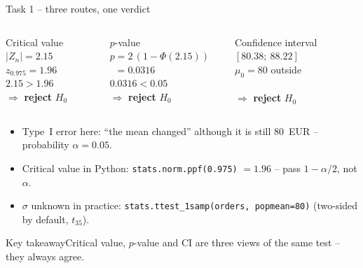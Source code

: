 \documentclass[aspectratio=169,11pt]{beamer}
\newcommand{\kernaussage}[1]{\begin{alertblock}{Key takeaway}#1\end{alertblock}}
\begin{document}
\begin{frame}{Task 1 -- three routes, one verdict}
  \begin{columns}[T]
    \begin{block}{Critical value}
      $|Z_n| = 2.15$\\ $z_{0.975} = 1.96$\\[2pt]
      $2.15 > 1.96$\\ $\Rightarrow$ \textbf{reject} $H_0$
    \end{block}
    \begin{block}{$p$-value}
      $p = 2\,(1-\Phi(2.15))$\\ $\phantom{p} = 0.0316$\\[2pt]
      $0.0316 < 0.05$\\ $\Rightarrow$ \textbf{reject} $H_0$
    \end{block}
    \begin{block}{Confidence interval}
      $[80.38;\ 88.22]$\\ $\mu_0 = 80$ outside\\[2pt]
      \phantom{x}\\ $\Rightarrow$ \textbf{reject} $H_0$
    \end{block}
  \end{columns}
  \medskip
  \begin{itemize}\setlength{\itemsep}{2pt}
    \item Type~I error here: ``the mean changed'' although it is still $80$~EUR -- probability $\alpha = 0.05$.
    \item Critical value in Python: \texttt{stats.norm.ppf(0.975)} $= 1.96$ -- pass $1-\alpha/2$, not $\alpha$.
    \item $\sigma$ unknown in practice: \texttt{stats.ttest\_1samp(orders, popmean=80)} (two-sided by default, $t_{35}$).
  \end{itemize}
  \kernaussage{Critical value, $p$-value and CI are three views of the same test -- they always agree.}
\end{frame}
\end{document}
